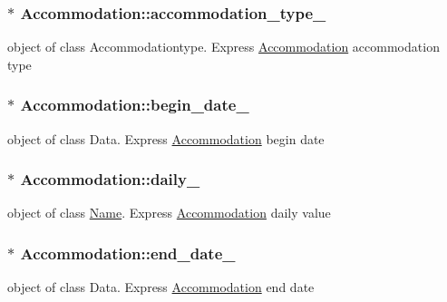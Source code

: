 \subsubsection[{\texorpdfstring{accommodation\+\_\+type\+\_\+}{accommodation_type_}}]{$\ast$ Accommodation\+::accommodation\+\_\+type\+\_\+\hspace{0.3cm}{\ttfamily [private]}}\hypertarget{classAccommodation_a4723e6ff8384fcec8f8050838718f736}{}\label{classAccommodation_a4723e6ff8384fcec8f8050838718f736}
object of class Accommodationtype. Express \hyperlink{classAccommodation}{Accommodation} accommodation type 
\subsubsection[{\texorpdfstring{begin\+\_\+date\+\_\+}{begin_date_}}]{$\ast$ Accommodation\+::begin\+\_\+date\+\_\+\hspace{0.3cm}{\ttfamily [private]}}\hypertarget{classAccommodation_a7dd8db2c54db102d489917d54eb72f7c}{}\label{classAccommodation_a7dd8db2c54db102d489917d54eb72f7c}
object of class Data. Express \hyperlink{classAccommodation}{Accommodation} begin date 
\subsubsection[{\texorpdfstring{daily\+\_\+}{daily_}}]{$\ast$ Accommodation\+::daily\+\_\+\hspace{0.3cm}{\ttfamily [private]}}\hypertarget{classAccommodation_a70b760e8b582bd0f0f535c2018204e0f}{}\label{classAccommodation_a70b760e8b582bd0f0f535c2018204e0f}
object of class \hyperlink{className}{Name}. Express \hyperlink{classAccommodation}{Accommodation} daily value 
\subsubsection[{\texorpdfstring{end\+\_\+date\+\_\+}{end_date_}}]{$\ast$ Accommodation\+::end\+\_\+date\+\_\+\hspace{0.3cm}{\ttfamily [private]}}\hypertarget{classAccommodation_a793df0ed746ce5385b47af950145f0b0}{}\label{classAccommodation_a793df0ed746ce5385b47af950145f0b0}
object of class Data. Express \hyperlink{classAccommodation}{Accommodation} end date 
